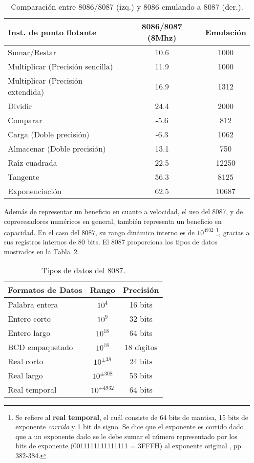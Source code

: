 \begin{center}
\begin{table}[!htb]
\begin{tabular}{l | c | c} \hline
Inst. de punto flotante & 8086/8087 (8Mhz) & Emulaci\'on \\ \hline
Sumar/Restar & 10.6 & 1000 \\ 
Multiplicar (Precisi\'on sencilla) & 11.9 & 1000 \\ 
Multiplicar (Precisi\'on extendida) & 16.9 & 1312 \\
Dividir & 24.4 & 2000 \\
Comparar & -5.6 & 812 \\
Carga (Doble precisi\'on) & -6.3 & 1062 \\
Almacenar (Doble precisi\'on) & 13.1 & 750 \\
Ra\'{\i}z cuadrada & 22.5 & 12250 \\
Tangente & 56.3 & 8125 \\
Exponenciaci\'on & 62.5 & 10687 \\ \hline
\end{tabular}
\caption{Comparaci\'on entre 8086/8087 (izq.) y 8086 emulando a 8087 (der.).}
\label{8087:time}
\end{table}
\end{center}

Adem\'as de representar un beneficio en cuanto a velocidad, el uso del 8087, y de coprocesadores %
num\'ericos en general, tambi\'en representa un beneficio en capacidad. En el caso del 8087, su %
rango din\'amico interno es de $10^{4932}$ \footnote{Se refiere al {\bf real temporal}, el %
cu\'al consiste de 64 bits de mantisa, 15 bits de exponente {\it corrido} y 1 bit de signo. Se %
dice que el exponente es corrido dado que a un exponente dado se le debe sumar el n\'umero %
representado por los bits de exponente (0011111111111111 = 3FFFH) al exponente original %
\cite{Hall}, pp. 382-384.}, gracias a sus registros internos de 80 bits. El 8087 proporciona %
los tipos de datos mostrados en la Tabla~\ref{tabla:tipodatos}.

\begin{table}[!htb]
\centering
\begin{tabular}{|l|c|c|} \hline
Formatos de Datos & Rango & Precisi\'on \\ \hline
Palabra entera & $10^{4}$ & 16 bits \\
Entero corto & $10^{9}$ & 32 bits \\
Entero largo & $10^{18}$ & 64 bits \\
BCD empaquetado & $10^{18}$ & 18 d\'{\i}gitos \\
Real corto & $10^{\pm 38}$ & 24 bits \\
Real largo & $10^{\pm 308}$ & 53 bits \\
Real temporal & $10^{\pm 4932}$ & 64 bits \\ \hline
\end{tabular}
\caption{Tipos de datos del 8087.}
\label{tabla:tipodatos}
\end{table}


